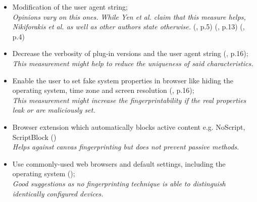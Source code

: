 \begin{itemize}
	\item Modification of the user agent string;\\
	\textit{Opinions vary on this ones. While Yen et al. claim that this measure helps, Nikiforakis et al. as well as other authors state otherwise.} (\textcite{yen09}, p.5) (\textcite{nikiforakis13}, p.13) (\textcite{eckersley10}, p.4)
	
	\item Decrease the verbosity of plug-in versions and the user agent string (\textcite{boda11}, p.16);\\
	\textit{This measurement might help to reduce the uniqueness of said characteristics.}
	
	\item Enable the user to set fake system properties in browser like hiding the operating system, time zone and screen resolution (\textcite{boda11}, p.16);\\
	\textit{This measurement might increase the fingerprintability if the real properties leak or are maliciously set.}
	
	\item Browser extension which automatically blocks active content e.g. NoScript, ScriptBlock (\textcite{web17}) \\
	\textit{Helps against canvas fingerprinting but does not prevent passive methods.}
	
	\item Use commonly-used web browsers and default settings, including the operating system (\textcite{web17});\\
	\textit{Good suggestions as no fingerprinting technique is able to distinguish identically configured devices.}	
\end{itemize}


